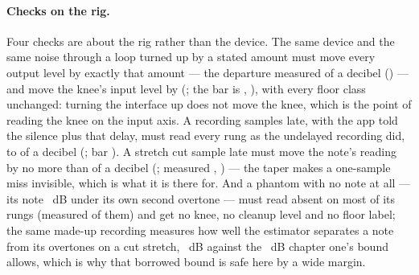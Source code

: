 \documentclass[11pt,a4paper]{article}
\begin{document}
\paragraph{Checks on the rig.} Four checks are about the rig rather than the device. The same device and
the same noise through a loop turned up by a stated amount must move
every output level by exactly that amount --- the departure measured
\cparityGainShiftWords{} of a decibel (\cparityGainShift{}) --- and move
the knee's input level by \cparityGainKneeMoveWords{}
(\cparityGainKneeMove{}; the bar is \cparityGainWords{}, \cparityGain{}),
with every floor class unchanged: turning the interface up does not move
the knee, which is the point of reading the knee on the input axis. A
recording \cparityLatencyFound{} samples late, with the app told the
silence plus that delay, must read every rung as the undelayed recording
did, to \cparityLatencyMoveWords{} of a decibel (\cparityLatencyMove{};
bar \cparityLatencyWords{}). A stretch cut \cparityMiscutSamples{} sample
late must move the note's reading by no more than
\cparityMiscutWords{} of a decibel (\cparityMiscut{}; measured
\cparityMiscutMoveWords{}, \cparityMiscutMove{}) --- the taper makes a
one-sample miss invisible, which is what it is there for. And a phantom
with no note at all --- its note \cparityAbsentDepth{}~dB under its own
second overtone --- must read absent on most of its rungs (measured
\cparityAbsentFraction{} of them) and get no knee, no cleanup level and
no floor label; the same made-up recording measures how well the
estimator separates a note from its overtones on a cut stretch,
\cparitySeparation{}~dB against the \cparitySeparationBar{}~dB chapter
one's bound allows, which is why that borrowed bound is safe here by a
wide margin. \cparityPartBStatus
\end{document}
